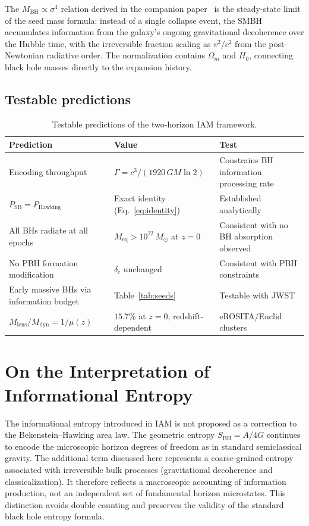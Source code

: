 \documentclass[12pt,a4paper]{article}
\begin{document}
The $M_\mathrm{BH} \propto \sigma^4$ relation derived in the companion
paper~\citep{Mahaffey2026c} is the steady-state limit of the seed mass formula:
instead of a single collapse event, the SMBH accumulates information from the
galaxy's ongoing gravitational decoherence over the Hubble time, with the
irreversible fraction scaling as $v^2/c^2$ from the post-Newtonian radiative
order. The normalization contains $\Omega_m$ and $H_0$, connecting black hole
masses directly to the expansion history.

\subsection{Testable predictions}

\begin{table}[h]
\centering
\small
\caption{Testable predictions of the two-horizon IAM framework.}
\label{tab:predictions}
\begin{tabular}{p{4.5cm}p{4.5cm}p{4.5cm}}
\toprule
Prediction & Value & Test \\
\midrule
Encoding throughput & $\Gamma = c^3/(1920\,GM\ln 2)$ & Constrains BH information processing rate \\[4pt]
$P_\mathrm{SB} = P_\mathrm{Hawking}$ & Exact identity (Eq.~\ref{eq:identity}) & Established analytically \\[4pt]
All BHs radiate at all epochs & $M_\mathrm{eq} > 10^{22}\,M_\odot$ at $z=0$ & Consistent with no BH absorption observed \\[4pt]
No PBH formation modification & $\delta_c$ unchanged & Consistent with PBH constraints \\[4pt]
Early massive BHs via information budget & Table~\ref{tab:seeds} & Testable with JWST \\[4pt]
$M_\mathrm{lens}/M_\mathrm{dyn} = 1/\mu(z)$ & $15.7\%$ at $z=0$, redshift-dependent & eROSITA/Euclid clusters \citep{Mahaffey2026d} \\
\bottomrule
\end{tabular}
\end{table}


\section{On the Interpretation of Informational Entropy}

The informational entropy introduced in IAM is not proposed as a correction
to the Bekenstein--Hawking area law. The geometric entropy
$S_{\mathrm{BH}} = A/4G$ continues to encode the microscopic horizon
degrees of freedom as in standard semiclassical gravity. The additional
term discussed here represents a coarse-grained entropy associated with
irreversible bulk processes (gravitational decoherence and classicalization).
It therefore reflects a macroscopic accounting of information production,
not an independent set of fundamental horizon microstates. This distinction
avoids double counting and preserves the validity of the standard
black hole entropy formula.
\end{document}

